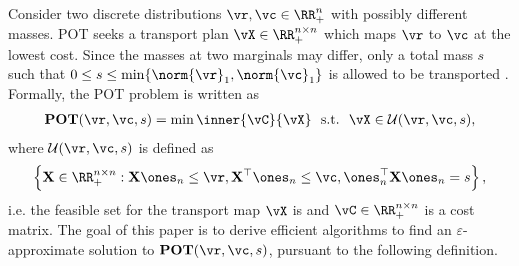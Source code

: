

Consider two discrete distributions $\vr, \vc \in \RR_+^{n}$ with possibly different masses. POT seeks a transport plan $\vX \in \RR_{+}^{n \times n}$ which maps $\vr$ to $\vc$ at the lowest cost. Since the masses at two marginals may differ, only a total mass $s$ such that $0 \leq s \leq \min\{\norm{\vr}_1, \norm{\vc}_1\}$ is allowed to be transported \citep{Chapel-nips2020, nhatho-mmpot}. Formally, the POT problem is written as
\begin{align} \label{eq:pot_formulation}
  \mathbf{POT}(\vr, \vc, s) = \min \inner{\vC}{\vX} ~~\text{s.t.}~~ \vX \in \mathcal{U}(\vr, \vc, s),
\end{align}
where $\mathcal{U}(\vr, \vc, s)$ is defined as $$ \left\{ \mathbf{X} \in \RR_{+}^{n \times n} : \mathbf{X} \ones_n \leq \vr, \mathbf{X}^\top \ones_n \leq \vc, \ones_n^\top \mathbf{X} \ones_n = s \right\},$$ 
i.e. the feasible set for the transport map $\vX$ is and $\vC \in \RR^{n \times n}_+$ is a cost matrix.
The goal of this paper is to derive efficient algorithms to find an $\varepsilon$-approximate solution to $\mathbf{POT}(\vr, \vc, s)$, pursuant to the following definition.

